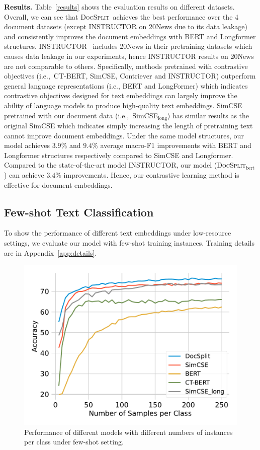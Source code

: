 \documentclass[11pt]{article}
\newcommand{\our}{\mbox{\textsc{DocSplit}}}
\begin{document}
\textbf{Results.}
Table~\ref{results} shows the evaluation results on different datasets. 
Overall, we can see that \our~achieves the best performance over the 4 document datasets (except INSTRUCTOR on 20News due to its data leakage) and consistently improves the document embeddings with BERT and Longformer structures. 
INSTRUCTOR~\cite{Su2022OneEA} includes 20News in their pretraining datasets which causes data leakage in our experiments, hence INSTRUCTOR results on 20News are not comparable to others.
Specifically, methods pretrained with contrastive objectives (i.e.,~CT-BERT, SimCSE, Contriever and INSTRUCTOR) outperform general language representations (i.e., BERT and LongFormer) which indicates contrastive objectives designed for text embeddings can largely improve the ability of language models to produce high-quality text embeddings. 
SimCSE pretrained with our document data (i.e.,~SimCSE$_{\mathrm{long}}$) has similar results as the original SimCSE which indicates simply increasing the length of pretraining text cannot improve document embeddings.
Under the same model structures, our model achieves $3.9\%$ and $9.4\%$ average macro-F1 improvements with BERT and Longformer structures respectively compared to SimCSE and Longformer. 
Compared to the state-of-the-art model INSTRUCTOR, our model (\our$_{\mathrm{bert}}$) can achieve $3.4\%$ improvements.
Hence, our contrastive learning method is effective for document embeddings.


\subsection{Few-shot Text Classification}
To show the performance of different text embeddings under low-resource settings, we evaluate our model with few-shot training instances.
Training details are in Appendix~\ref{app:details}.

\begin{figure}
\centering
\includegraphics[width=0.8\linewidth]{fig/few_shot.pdf}
\caption{Performance of different models with different numbers of instances per class under few-shot setting.}
\label{few_shot}
\end{figure}
\end{document}
